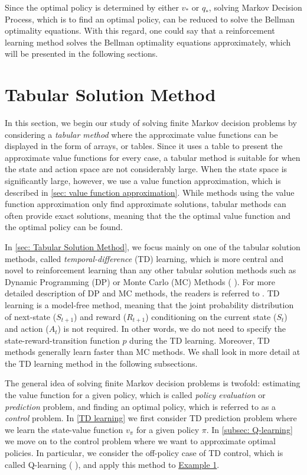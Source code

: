Since the optimal policy is determined by either $v_\ast$ or $q_\ast$, solving Markov Decision Process, which is to find an optimal policy, can be reduced to solve the Bellman optimality equations. With this regard, one could say that a reinforcement learning method solves the Bellman optimality equations approximately, which will be presented in the following sections.

\section{Tabular Solution Method}
\label{sec: Tabular Solution Method}
In this section, we begin our study of solving finite Markov decision problems by considering a \textit{tabular method} where the approximate value functions can be displayed in the form of arrays, or tables. Since it uses a table to present the approximate value functions for every case, a tabular method is suitable for when the state and action space are not considerably large. When the state space is significantly large, however, we use a value function approximation, which is described in \autoref{sec: value function approximation}. While methods using the value function approximation only find approximate solutions, tabular methods can often provide exact solutions, meaning that the the optimal value function and the optimal policy can be found.

In \autoref{sec: Tabular Solution Method}, we focus mainly on one of the tabular solution methods, called \textit{temporal-difference} (TD) learning, which is more central and novel to reinforcement learning than any other tabular solution methods such as Dynamic Programming (DP) or Monte Carlo (MC) Methods (\citeauthor{sutton2018reinforcement} \cite{sutton2018reinforcement}). For more detailed description of DP and MC methods, the readers is referred to \citeauthor{sutton2018reinforcement} \cite{sutton2018reinforcement}. TD learning is a model-free method, meaning that the joint probability distribution of next-state ($S_{t+1}$) and reward ($R_{t+1}$) conditioning on the current state ($S_{t}$) and action ($A_{t}$) is not required. In other words, we do not need to specify the state-reward-transition function $p$ during the TD learning. Moreover, TD methods generally learn faster than MC methods. We shall look in more detail at the TD learning method in the following subsections.

The general idea of solving finite Markov decision problems is twofold: estimating the value function for a given policy, which is called \textit{policy evaluation} or \textit{prediction} problem, and finding an optimal policy, which is referred to as a \textit{control} problem. In \autoref{TD learning} we first consider TD prediction problem where we learn the state-value function $v_\pi$ for a given policy $\pi$. In \autoref{subsec: Q-learning} we move on to the control problem where we want to approximate optimal policies. In particular, we consider the off-policy case of TD control, which is called Q-learning (\citeauthor{watkins1989learning} \cite{watkins1989learning}), and apply this method to \hyperref[fig:toy graph]{Example 1}.

